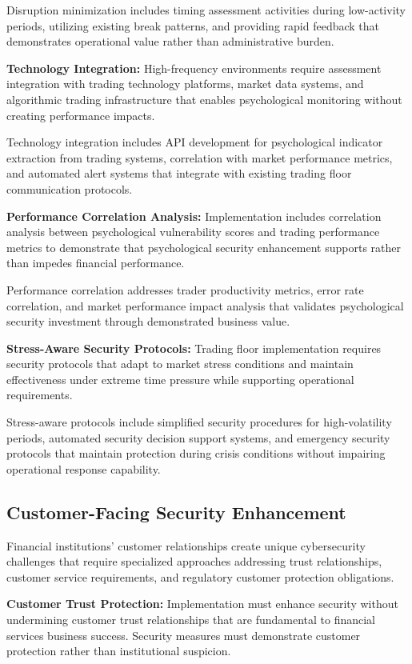 \documentclass[10pt, twocolumn]{article}
\begin{document}
Disruption minimization includes timing assessment activities during low-activity periods, utilizing existing break patterns, and providing rapid feedback that demonstrates operational value rather than administrative burden.

\textbf{Technology Integration:} High-frequency environments require assessment integration with trading technology platforms, market data systems, and algorithmic trading infrastructure that enables psychological monitoring without creating performance impacts.

Technology integration includes API development for psychological indicator extraction from trading systems, correlation with market performance metrics, and automated alert systems that integrate with existing trading floor communication protocols.

\textbf{Performance Correlation Analysis:} Implementation includes correlation analysis between psychological vulnerability scores and trading performance metrics to demonstrate that psychological security enhancement supports rather than impedes financial performance.

Performance correlation addresses trader productivity metrics, error rate correlation, and market performance impact analysis that validates psychological security investment through demonstrated business value.

\textbf{Stress-Aware Security Protocols:} Trading floor implementation requires security protocols that adapt to market stress conditions and maintain effectiveness under extreme time pressure while supporting operational requirements.

Stress-aware protocols include simplified security procedures for high-volatility periods, automated security decision support systems, and emergency security protocols that maintain protection during crisis conditions without impairing operational response capability.

\subsection{Customer-Facing Security Enhancement}

Financial institutions' customer relationships create unique cybersecurity challenges that require specialized approaches addressing trust relationships, customer service requirements, and regulatory customer protection obligations.

\textbf{Customer Trust Protection:} Implementation must enhance security without undermining customer trust relationships that are fundamental to financial services business success. Security measures must demonstrate customer protection rather than institutional suspicion.
\end{document}
